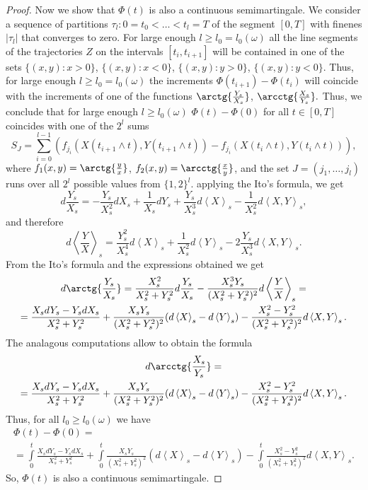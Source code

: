 \documentclass[12pt, a4paper, titlepage]{article}
\begin{document}
\begin{proof}
Now we show that $\Phi(t)$ is also a continuous semimartingale. 
We consider a sequence of partitions
$\tau_l: 0=t_0<\ldots<t_l=T$ of the segment $[0, T]$ with finenes $|\tau_l|$
that converges to zero.
For large enough $l\ge l_0=l_0(\omega)$ all the line segments of the trajectories $Z$ 
on the intervals 
$[t_i, t_{i+1}]$ will be contained in one of the sets $\{(x,y)\colon x>0\}$,
$\{(x,y)\colon x<0\}$,
$\{(x,y)\colon y>0\}$,
$\{(x,y)\colon y<0\}$.
Thus, for large enough $l\ge l_0=l_0(\omega)$ the increments $\Phi(t_{i+1})-\Phi(t_i)$
will coincide with the increments of one of the functions $\arctg{\frac{Y_s}{X_s}}$, $\arcctg{\frac{X_s}{Y_s}}.$
Thus, we conclude that for large enough $l \ge l_0(\omega)$
$\Phi(t)-\Phi(0)$ for all $t \in [0, T]$
coincides with one of the $2^l$ sums
$$S_J=\sum\limits_{i=0}^{l-1}(f_{j_i}(X(t_{i+1}\wedge t), Y(t_{i+1} \wedge t))-
f_{j_i}(X(t_i \wedge t), Y(t_i \wedge t))),$$
where $f_1(x, y)=\arctg{\frac{y}{x}}$, $f_2(x, y)=\arcctg{\frac{x}{y}}$,
and the set $J=(j_1, \ldots, j_l)$ runs over all $2^l$ possible values from $\{1, 2\}^l.$
applying the Ito's formula, we get
$$d\frac{Y_s}{X_s}=-\frac{Y_s}{X_s^2}dX_s+\frac{1}{X_s}dY_s+\frac{Y_s}{X_s^3}d\left<X\right>_s-
\frac{1}{X_s^2}d\left<X,Y\right>_s,$$
and therefore
$$d\left<\frac{Y}{X}\right>_s=\frac{Y_s^2}{X_s^4}d\left<X\right>_s+\frac{1}{X_s^2}d\left<Y\right>_s-
2\frac{Y_s}{X_s^3}d\left<X, Y\right>_s.$$
From the Ito's formula and the expressions obtained we get
\begin{multline*}
 d\arctg{\frac{Y_s}{X_s}}=\frac{X_s^2}{X_s^2+Y_s^2}d\frac{Y_s}{X_s}-
\frac{X_s^3 Y_s}{(X_s^2+Y_s^2)^2}d\left<\frac{Y}{X}\right>_s=\\=
\frac{X_s dY_s-Y_s dX_s}{X_s^2+Y_s^2}+\frac{X_sY_s}{(X_s^2+Y_s^2)^2}(d\left<X\right>_s-d\left<Y\right>_s)-
\frac{X_s^2-Y_s^2}{(X_s^2+Y_s^2)^2}d\left<X,Y\right>_s.
\end{multline*}
The analagous computations allow to obtain the formula
\begin{multline*}
 d\arcctg{\frac{X_s}{Y_s}}=\\=
\frac{X_s dY_s-Y_s dX_s}{X_s^2+Y_s^2}+\frac{X_sY_s}{(X_s^2+Y_s^2)^2}(d\left<X\right>_s-d\left<Y\right>_s)-
\frac{X_s^2-Y_s^2}{(X_s^2+Y_s^2)^2}d\left<X,Y\right>_s.
\end{multline*}
Thus, for all $l_0 \ge l_0(\omega)$ we have
\begin{multline*}
 \Phi(t)-\Phi(0)=\\=\int\limits_0^t \frac{X_s dY_s-Y_s dX_s}{X_s^2+Y_s^2}+
\int\limits_0^t \frac{X_sY_s}{(X_s^2+Y_s^2)^2}(d\left<X\right>_s-d\left<Y\right>_s)-
\int\limits_0^t \frac{X_s^2-Y_s^2}{(X_s^2+Y_s^2)^2}d\left<X,Y\right>_s.
\end{multline*}
So, $\Phi(t)$ is also a continuous semimartingale. 
\end{proof}
\end{document}
